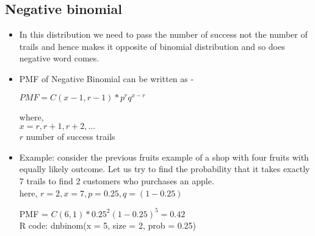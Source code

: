 \documentclass{article}
\begin{document}
\subsection{Negative binomial}
\begin{itemize}
	\item In this distribution we need to pass the number of success not the number of trails and hence makes it opposite of binomial distribution and so does negative word comes.
	\item PMF of Negative Binomial can be written as -
	
	\begin{center}$PMF = C(x-1,r-1)*p^rq^{x-r}$ 	\end{center}
	
	where,\\
	$x = r, r+1, r+2, ...$\\
	$r$ number of success trails
	\item Example: consider the previous fruits example of a shop with four fruits with equally likely outcome. Let us try to find the probability that it takes exactly 7 trails to find 2 customers who purchases an apple.\\
	here, $r=2, x=7, p=0.25, q=(1-0.25)$
	\begin{center}
		PMF = $C(6,1)*0.25^2(1-0.25)^5=0.42$\\
		R code: dnbinom(x = 5, size = 2, prob = 0.25)
	\end{center}
\end{itemize}
\end{document}
